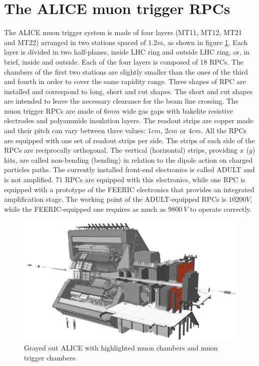 \section{The ALICE muon trigger RPCs}
The ALICE muon trigger system is made of four layers (MT11, MT12, MT21 and MT22) arranged in two stations spaced of $1.2m$, as shown in figure \ref{fig:ALICEmuon}.
Each layer is divided in two half-planes, inside LHC ring and outside LHC ring, or, in brief, inside and outside.
Each of the four layers is composed of 18 RPCs.
The chambers of the first two stations are slightly smaller than the ones of the third and fourth in order to cover the same rapidity range.
Three shapes of RPC are installed and correspond to long, short and cut shapes.
The short and cut shapes are intended to leave the necessary clearance for the beam line crossing.
The muon trigger RPCs are made of $6mm$ wide gas gaps with bakelite resistive electrodes and polyammide insulation layers.
The readout strips are copper made and their pitch can vary between three values: $1cm$, $2cm$ or $4cm$.
All the RPCs are equipped with one set of readout strips per side.
The strips of each side of the RPCs are reciprocally orthogonal.
The vertical (horizontal) strips, providing $x$ ($y$) hits, are called non-bending (bending) in relation to the dipole action on charged particles paths.
The currently installed front-end electronics is called ADULT and is not amplified.
71 RPCs are equipped with this electronics, while one RPC is equipped with a prototype of the FEERIC electronics that provides an integrated amplification stage.
The working point of the ADULT-equipped RPCs is $10200V$, while the FEERIC-equipped one requires as much as $9800\ V$ to operate correctly.

\begin{figure}[!t]
\begin{center}
\includegraphics[width=\linewidth]{Chapters/Performance/Figs/ALICEmuon_MTR.png}
\caption{Grayed out ALICE with highlighted muon chambers and muon trigger chambers.}
\label{fig:ALICEmuon}
\end{center}
\end{figure}

